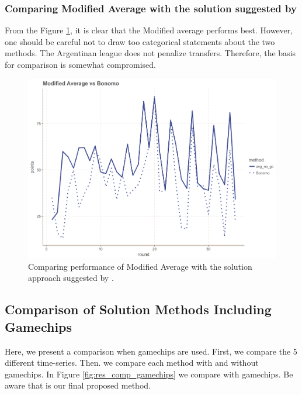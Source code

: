 \subsubsection{Comparing Modified Average with the solution suggested by \cite{Bonomo}}

From the Figure \ref{fig:avg_vs_bon}, it is clear that the Modified average performs best. However, one should be careful not to draw too categorical statements about the two methods. The Argentinan league does not penalize transfers. Therefore, the basis for comparison is somewhat compromised.  

\begin{figure}[H]
    \centering
    \includegraphics[scale=0.5]{fig/chapter_7/bon_gc_no_gc.png}
    \caption{Comparing performance of Modified Average with the solution approach suggested by \citep{Bonomo}.}
\label{fig:avg_vs_bon}    
\end{figure}

\subsection{Comparison of Solution Methods Including Gamechips}

Here, we present a comparison when gamechips are used. First, we compare the 5 different time-series. Then. we compare each method with and without gamechips. In Figure \ref{fig:res_comp_gamechips} we compare with gamechips. Be aware that is our final proposed method.

